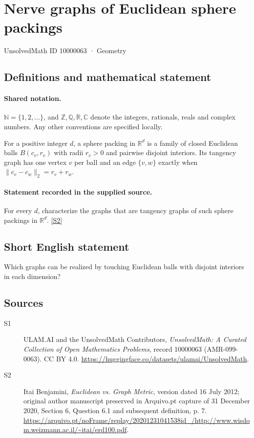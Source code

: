 \documentclass[11pt]{article}
\newcommand{\sref}[2]{\hyperlink{source:#1:#2}{[S#2]}}
\begin{document}
\setcounter{section}{10000062}
\section{Nerve graphs of Euclidean sphere packings}\label{10000063}
{\small\sffamily UnsolvedMath ID 10000063 · Geometry}
\subsection{Definitions and mathematical statement}

\paragraph{Shared notation.}$\mathbb N=\{1,2,\ldots\}$, and $\mathbb Z,\mathbb Q,\mathbb R,\mathbb C$ denote the integers, rationals, reals and complex numbers. Any other conventions are specified locally.


For a positive integer $d$, a sphere packing in $\mathbb R^d$ is a family of closed Euclidean balls $B(c_v,r_v)$ with radii $r_v>0$ and pairwise disjoint interiors. Its tangency graph has one vertex $v$ per ball and an edge $\{v,w\}$ exactly when $\|c_v-c_w\|_2=r_v+r_w$.
\paragraph{Statement recorded in the supplied source.}
For every $d$, characterize the graphs that are tangency graphs of such sphere packings in $\mathbb R^d$. \sref{10000063}{2}
\subsection{Short English statement}
Which graphs can be realized by touching Euclidean balls with disjoint interiors in each dimension?
\subsection{Sources}
\begin{description}
\item[\hypertarget{source:10000063:1}{S1}] ULAM.AI and the UnsolvedMath Contributors, \emph{UnsolvedMath: A Curated Collection of Open Mathematics Problems}, record 10000063 (AMR-099-0063). CC BY 4.0. \url{https://huggingface.co/datasets/ulamai/UnsolvedMath}.
\item[\hypertarget{source:10000063:2}{S2}] Itai Benjamini, \emph{Euclidean vs. Graph Metric}, version dated 16 July 2012; original author manuscript preserved in Arquivo.pt capture of 31 December 2020, Section 6, Question 6.1 and subsequent definition, p. 7. \url{https://arquivo.pt/noFrame/replay/20201231041538id_/http://www.wisdom.weizmann.ac.il/~itai/erd100.pdf}.
\end{description}
\label{end:10000063}
\end{document}

